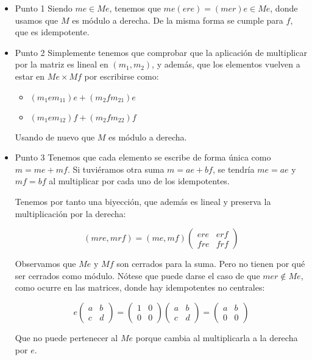 \documentclass[11pt]{article}
\begin{document}
\begin{itemize}
\begin{statement}
$\quad$
\end{statement}

\begin{itemize}
\item Punto 1
\label{sec-7-4-3-2-1}
Siendo $me \in Me$, tenemos que $me(ere) = (mer)e \in Me$, donde usamos que
$M$ es módulo a derecha. De la misma forma se cumple para $f$, que es
idempotente.

\item Punto 2
\label{sec-7-4-3-2-2}
Simplemente tenemos que comprobar que la aplicación de multiplicar por
la matriz es lineal en $(m_1,m_2)$, y además, que los elementos vuelven
a estar en $Me \times Mf$ por escribirse como:

\begin{itemize}
\item $(m_1em_{11})e + (m_2fm_{21})e$
\item $(m_1em_{12})f + (m_2fm_{22})f$
\end{itemize}

Usando de nuevo que $M$ es módulo a derecha.

\item Punto 3
\label{sec-7-4-3-2-3}
Tenemos que cada elemento se escribe de forma única como $m = me+mf$.
Si tuviéramos otra suma $m = ae + bf$, se tendría $me=ae$ y $mf=bf$ al
multiplicar por cada uno de los idempotentes.

Tenemos por tanto una biyección, que además es lineal y preserva la
multiplicación por la derecha:

\[
(mre,mrf) = (me,mf)\begin{pmatrix}ere&erf\\fre&frf\end{pmatrix}
\]

Observamos que $Me$ y $Mf$ son cerrados para la suma. Pero no tienen por
qué ser cerrados como módulo. Nótese que puede darse el caso de que
$mer \notin Me$, como ocurre en las matrices, donde hay idempotentes no
centrales:

\[ e\begin{pmatrix}
a & b \\ c & d
\end{pmatrix} = \begin{pmatrix}
1 & 0 \\ 0 & 0
\end{pmatrix} \begin{pmatrix}
a & b \\ c & d
\end{pmatrix} = \begin{pmatrix}
a & b \\ 0 & 0
\end{pmatrix}\]

Que no puede pertenecer al $Me$ porque cambia al multiplicarla a la derecha
por $e$.
\end{itemize}
\end{itemize}
\end{document}

